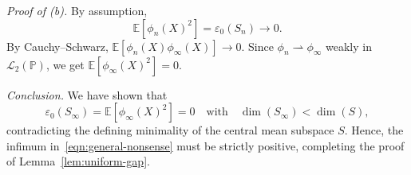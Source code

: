 \documentclass[sn-mathphys-num]{sn-jnl}%
\numberwithin{equation}{section}
\newcommand{\R}{\mathbb{R}}
\newcommand{\E}{\mathbb{E}}
\renewcommand{\P}{\mathbb{P}}
\newcommand{\eps}{\epsilon}
\theoremstyle{thmstyleone}%
\theoremstyle{thmstyletwo}%
\theoremstyle{thmstylethree}%
\begin{document}
\emph{Proof of (b).}
By assumption,
\[
\E[\phi_n(X)^2] = \varepsilon_0(S_n) \to 0 .
\]
By Cauchy--Schwarz,
$\E[\phi_n(X)\phi_\infty(X)] \to 0$. Since $\phi_n \rightharpoonup \phi_\infty$
weakly in $\mathcal{L}_2(\mathbb{P})$, we get
$
\E[\phi_\infty(X)^2] = 0$. 

%

\emph{Conclusion.}
We have shown that
\[
\varepsilon_0(S_\infty) = \E[\phi_\infty(X)^2] = 0
\quad \text{with} \quad \dim(S_\infty) < \dim(S),
\]
contradicting the defining minimality of the central mean subspace $S$. Hence,
the infimum in~\eqref{eqn:general-nonsense} must be strictly positive, completing
the proof of Lemma~\ref{lem:uniform-gap}.



\end{document}
